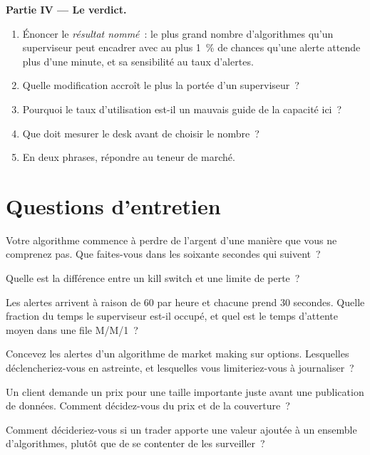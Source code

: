 \begin{problem}
\medskip\noindent\textbf{Partie IV --- Le verdict.}
\begin{enumerate}[resume]
\item Énoncer le \emph{résultat nommé}~: le plus grand nombre d'algorithmes qu'un superviseur peut encadrer avec au plus 1~\% de chances
qu'une alerte attende plus d'une minute, et sa sensibilité au taux d'alertes.
\item Quelle modification accroît le plus la portée d'un superviseur~?
\item Pourquoi le taux d'utilisation est-il un mauvais guide de la capacité ici~?
\item Que doit mesurer le desk avant de choisir le nombre~?
\item En deux phrases, répondre au teneur de marché.
\end{enumerate}
\end{problem}

\section{Questions d'entretien}

\begin{interviewq}\label{iq:in:trader:1}
Votre algorithme commence à perdre de l'argent d'une manière que vous ne comprenez pas. Que faites-vous dans les soixante secondes qui suivent~?
\end{interviewq}

\begin{interviewq}\label{iq:in:trader:2}
Quelle est la différence entre un kill switch et une limite de perte~?
\end{interviewq}

\begin{interviewq}\label{iq:in:trader:3}
Les alertes arrivent à raison de 60 par heure et chacune prend 30 secondes. Quelle fraction du temps le superviseur est-il occupé, et quel est
le temps d'attente moyen dans une file M/M/1~?
\end{interviewq}

\begin{interviewq}\label{iq:in:trader:4}
Concevez les alertes d'un algorithme de market making sur options. Lesquelles déclencheriez-vous en astreinte, et lesquelles vous limiteriez-vous à journaliser~?
\end{interviewq}

\begin{interviewq}\label{iq:in:trader:5}
Un client demande un prix pour une taille importante juste avant une publication de données. Comment décidez-vous du prix et de la couverture~?
\end{interviewq}

\begin{interviewq}\label{iq:in:trader:6}
Comment décideriez-vous si un trader apporte une valeur ajoutée à un ensemble d'algorithmes, plutôt que de se contenter de les surveiller~?
\end{interviewq}
